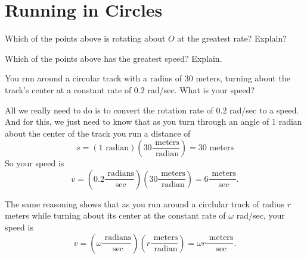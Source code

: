 \documentclass{ximera}
\begin{document}
\section{Running in Circles}
\begin{exploration}
 
\begin{onlineOnly}
    \begin{center}
\end{center}
\end{onlineOnly}


\begin{question} \label{Q72:Angles}
Which of the points above is rotating about $O$ at the greatest rate? Explain?
\begin{multipleChoice}  
\end{multipleChoice}  
\end{question}

\begin{question} \label{Q72:Angles}
Which of the points above has the greatest speed? Explain.
\begin{multipleChoice}  
\end{multipleChoice}  
\end{question}
\end{exploration}


\begin{question}  \label{Q2675: Angles}
You run around a circular track with a radius of $30$ meters, turning about the track's center at a constant rate of $0.2$ rad/sec. What is your speed?

\begin{explanation}
All we really need to do is to convert the rotation rate of $0.2$ rad/sec to a speed. And for this, we just need to know that 
as you turn through an angle of 1 radian about the center of the track you run a distance of 
\[
     s = (1 \text{ radian}) \left( 30 \frac{\text{ meters}}{\text{ radian}}\right) = 30 \text{ meters}
\]
So your speed is
\[
   v = \left( 0.2 \frac{\text{ radians}}{\text{ sec}}\right) \left( 30 \frac{\text{ meters}}{\text{ radian}}\right) = 6 \frac{\text{ meters}}{\text{ sec}}.
\]

The same reasoning shows that as you run around a circlular track of radius $r$ meters while turning about its center at the constant rate of $\omega$ rad/sec, your speed is
\[
   v = \left( \omega \frac{\text{ radians}}{\text{ sec}}\right) \left( r \frac{\text{ meters}}{\text{ radian}}\right) = \omega r \frac{\text{ meters}}{\text{ sec}}.
\]


\end{explanation}
\end{question}
\end{document}
